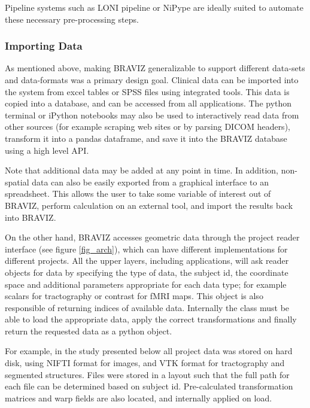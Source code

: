 \documentclass[twocolumn]{svjour3}
\begin{document}
Pipeline systems such as LONI pipeline \cite{dinov_efficient_2009} or NiPype \cite{gorgolewski_nipype:_2011} are ideally suited to automate these necessary pre-processing steps.

\subsubsection{Importing Data}


As mentioned above, making BRAVIZ generalizable to support different data-sets and data-formats was a primary design goal. Clinical data can be imported into the system from excel tables or SPSS files using integrated tools. This data is copied into a database, and can be accessed from all applications. The python terminal or iPython notebooks \cite{perez_ipython:_2007} may also be used to interactively read data from other sources (for example scraping web sites or by parsing DICOM headers), transform it into a pandas dataframe, and save it into the BRAVIZ database using a high level API.

Note that additional data may be added at any point in time. In addition, non-spatial data can also be easily exported from a graphical interface to an spreadsheet. This allows the user to take some variable of interest out of BRAVIZ, perform calculation on an external tool, and import the results back into BRAVIZ.

On the other hand, BRAVIZ accesses geometric data through the project reader interface (see figure \ref{fig_arch}), which can have different implementations for different projects. All the upper layers, including applications, will ask reader objects for data by specifying the type of data, the subject id, the coordinate space  and additional parameters appropriate for each data type; for example scalars for tractography or contrast for fMRI maps. This object is also responsible of returning indices of available data. Internally the class must be able to load the appropriate data, apply the correct transformations and finally return the requested data as a python object. 

For example, in the study presented below all project data was stored on hard disk, using NIFTI format for images, and VTK format for tractography and segmented structures. Files were stored in a layout such that the full path for each file can be determined based on subject id. Pre-calculated transformation matrices and warp fields are also located, and internally applied on load.
\end{document}
